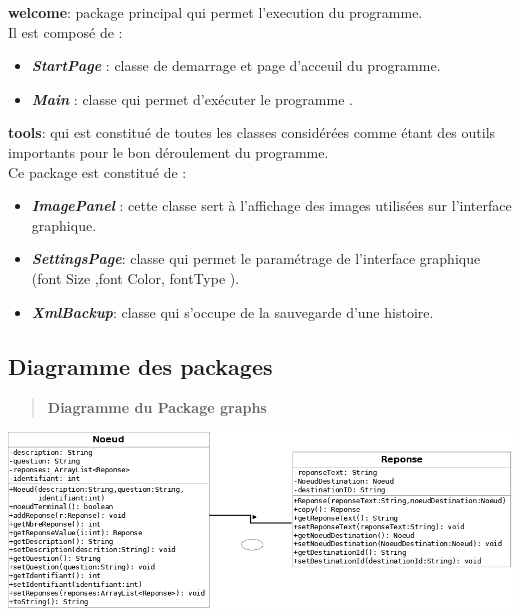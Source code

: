 \documentclass[12pt]{article}
\begin{document}
	\textbf{welcome}: package principal qui permet l'execution du programme. \\
	Il est composé de :
	\begin{itemize}
		\item \textbf{\textit{StartPage}} : classe de demarrage et page d'acceuil du programme.
		 \item \textbf{\textit{Main }}: classe qui permet d'exécuter le programme .
	\end{itemize}
	\textbf{tools}: qui est constitué de toutes les classes  considérées comme étant des outils importants pour le bon déroulement du programme.	\\ Ce package est constitué de :
	\begin{itemize} 
	 \item \textbf{\textit{ImagePanel}} : cette classe sert à l'affichage des images utilisées sur l'interface graphique.		 \item \textbf{\textit{SettingsPage}}: classe qui permet le paramétrage de l'interface graphique (font Size ,font Color, fontType ).
	  \item \textbf{\textit{XmlBackup}}: classe qui s'occupe de la sauvegarde d'une histoire.
	\end{itemize}
	
	
	\subsection{Diagramme des packages}
	
		\begin{center}
		\begin{verse}
		    \begin{center}
		       \textbf{Diagramme du Package graphs} 
		    \end{center}
		\end{verse} 
			\newcommand{\umlscale}{0.4}
			\includegraphics[scale=\umlscale]{./images/packageGraphs.png}
		\end{center}
	
\end{document}
